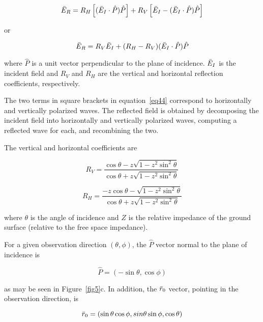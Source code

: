 \documentclass[12pt]{article}
\begin{document}
\begin{equation}
\bar{E}_R = R_H\left[(\bar{E}_I\cdot\hat{P})\hat{P}\right]
           + R_V\left[\bar{E}_I-(\bar{E}_I\cdot\hat{P})\hat{P}\right]
\label{eq45}
\end{equation}

or

\begin{equation}
\bar{E}_R = R_V\bar{E}_I + (R_H - R_V)(\bar{E}_I\cdot\hat{P})\hat{P}
\label{eq46}
\end{equation}

where $\hat{P}$ is a unit vector perpendicular to the plane of
incidence. $\bar{E}_I$ is the incident field and $R_V$ and $R_H$ are
the vertical and horizontal reflection coefficients, respectively.

The two terms in square brackets in equation~\eqref{eq44} correspond to
horizontally and vertically polarized waves. The reflected field is
obtained by decomposing the incident field into horizontally and
vertically polarized waves, computing a reflected wave for each, and
recombining the two.

The vertical and horizontal coefficients are

\begin{equation}
R_V = \frac{\cos\theta - z\sqrt{1-z^2\sin^2\theta}}
           {\cos\theta + z\sqrt{1-z^2\sin^2\theta}}
\label{eq47}
\end{equation}

\begin{equation}
R_H = \frac{-z\cos\theta - \sqrt{1-z^2\sin^2\theta}}
           {\cos\theta + z\sqrt{1-z^2\sin^2\theta}}
\label{eq48}
\end{equation}

where $\theta$ is the angle of incidence and $Z$ is the relative
impedance of the ground surface (relative to the free space impedance).

For a given observation direction $(\theta, \phi)$, the $\hat{P}$ vector
normal to the plane of incidence is

\begin{equation}
\hat{P} = (-\sin\theta, \cos\phi)
\label{eq49}
\end{equation}

as may be seen in Figure~\ref{fig5}c. In addition, the $\bar{r}_0$
vector, pointing in the observation direction, is

\begin{equation}
\bar{r}_0 = (\sin\theta\cos\phi, sin\theta\sin\phi, \cos\theta)
\label{eq50}
\end{equation}
\end{document}

